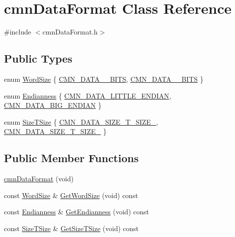 \hypertarget{classcmn_data_format}{\section{cmn\-Data\-Format Class Reference}
\label{classcmn_data_format}
}


{\ttfamily \#include $<$cmn\-Data\-Format.\-h$>$}

\subsection*{Public Types}
\begin{DoxyCompactItemize}
\item 
enum \hyperlink{classcmn_data_format_a897f5e1e8ad8d52f14a856ae67f487f9}{Word\-Size} \{ \hyperlink{classcmn_data_format_a897f5e1e8ad8d52f14a856ae67f487f9a7e089e93b79bd7a5b624002ed92de6a8}{C\-M\-N\-\_\-\-D\-A\-T\-A\-\_\-\_\-\-B\-I\-T\-S}, 
\hyperlink{classcmn_data_format_a897f5e1e8ad8d52f14a856ae67f487f9a8ceb42a89d9dd3fefe9eefc5f50abfa9}{C\-M\-N\-\_\-\-D\-A\-T\-A\-\_\-\_\-\-B\-I\-T\-S}
 \}
\item 
enum \hyperlink{classcmn_data_format_a5716c5b95f7cdbbc81eb2cefd23efed1}{Endianness} \{ \hyperlink{classcmn_data_format_a5716c5b95f7cdbbc81eb2cefd23efed1a4c9405bca6724a43694977b303ff3b96}{C\-M\-N\-\_\-\-D\-A\-T\-A\-\_\-\-L\-I\-T\-T\-L\-E\-\_\-\-E\-N\-D\-I\-A\-N}, 
\hyperlink{classcmn_data_format_a5716c5b95f7cdbbc81eb2cefd23efed1a1f6ea3b537a59b48ef9e1dc247de892c}{C\-M\-N\-\_\-\-D\-A\-T\-A\-\_\-\-B\-I\-G\-\_\-\-E\-N\-D\-I\-A\-N}
 \}
\item 
enum \hyperlink{classcmn_data_format_a9cb91a7a86d6c6078e5566b56d225d07}{Size\-T\-Size} \{ \hyperlink{classcmn_data_format_a9cb91a7a86d6c6078e5566b56d225d07afaf010845c4ab7a08d63921a5dabc7a4}{C\-M\-N\-\_\-\-D\-A\-T\-A\-\_\-\-S\-I\-Z\-E\-\_\-\-T\-\_\-\-S\-I\-Z\-E\-\_}, 
\hyperlink{classcmn_data_format_a9cb91a7a86d6c6078e5566b56d225d07a14e728b3313463dddff17ccf1383192d}{C\-M\-N\-\_\-\-D\-A\-T\-A\-\_\-\-S\-I\-Z\-E\-\_\-\-T\-\_\-\-S\-I\-Z\-E\-\_}
 \}
\end{DoxyCompactItemize}
\subsection*{Public Member Functions}
\begin{DoxyCompactItemize}
\item 
\hyperlink{classcmn_data_format_a7b631ddffe4a2c6919e6b54f378e5f0f}{cmn\-Data\-Format} (void)
\item 
const \hyperlink{classcmn_data_format_a897f5e1e8ad8d52f14a856ae67f487f9}{Word\-Size} \& \hyperlink{classcmn_data_format_ad4cef1d365a5512f7771f1004d0963c1}{Get\-Word\-Size} (void) const 
\item 
const \hyperlink{classcmn_data_format_a5716c5b95f7cdbbc81eb2cefd23efed1}{Endianness} \& \hyperlink{classcmn_data_format_aa0de59ff5675c333e603d79ca618317b}{Get\-Endianness} (void) const 
\item 
const \hyperlink{classcmn_data_format_a9cb91a7a86d6c6078e5566b56d225d07}{Size\-T\-Size} \& \hyperlink{classcmn_data_format_ad71f90cb29b5aaa9a5db549e1c699e3b}{Get\-Size\-T\-Size} (void) const 
\end{DoxyCompactItemize}
